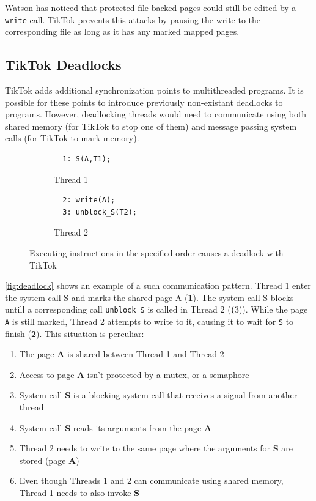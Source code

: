 Watson has noticed that protected file-backed pages could still be edited by a \texttt{write} call. TikTok prevents this attacks
by pausing the write to the corresponding file as long as it has any marked mapped pages.

\subsection{TikTok Deadlocks}
\label{subsec:deadlocks}
TikTok adds additional synchronization points to multithreaded programs. It is possible for these points to introduce 
previously non-existant deadlocks to programs. However, deadlocking threads would need to communicate using both 
shared memory (for TikTok to stop one of them) and message passing system calls (for TikTok to mark memory).


\begin{figure}
  \centering
  \begin{subfigure}[b]{0.45\linewidth}
  \begin{minipage}{\linewidth}
  \begin{lstlisting}
  1: S(A,T1);  
  \end{lstlisting}
  \end{minipage}
  \caption{Thread 1}
  \end{subfigure}
  \hfill
  \begin{subfigure}[b]{0.45\linewidth}
  \begin{minipage}{\linewidth}
  \begin{lstlisting}
  2: write(A);
  3: unblock_S(T2);
  \end{lstlisting}  
  \end{minipage}
  \caption{Thread 2}
  \end{subfigure}
  \caption{Executing instructions in the specified order causes a deadlock with TikTok}
  \label{fig:deadlock}
\end{figure}


\autoref{fig:deadlock} shows an example of a such communication pattern. Thread 1 enter the system call S and marks the shared page A (\textbf{1}).
The system call S blocks untill a corresponding call \texttt{unblock\_S} is called in Thread 2 (\textbf(3)). While the page \texttt{A} is still marked, Thread 2
attempts to write to it, causing it to wait for \texttt{S} to finish (\textbf{2}).
This situation is perculiar:
\begin{enumerate}
    \item The page \textbf{A} is shared between Thread 1 and Thread 2
    \item Access to page \textbf{A} isn't protected by a mutex, or a semaphore
    \item System call \textbf{S} is a blocking system call that receives a signal from another thread
    \item System call \textbf{S} reads its arguments from the page \textbf{A}
    \item Thread 2 needs to write to the same page where the arguments for \textbf{S} are stored (page \textbf{A})
    \item Even though Threads 1 and 2 can communicate using shared memory, Thread 1 needs to also invoke \textbf{S}
\end{enumerate}

